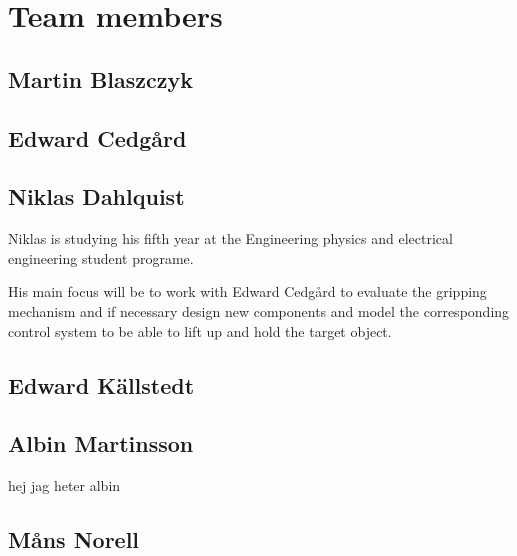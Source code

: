 \section{Team members}

\subsection{Martin Blaszczyk}

\subsection{Edward Cedgård}

\subsection{Niklas Dahlquist}
Niklas is studying his fifth year at the Engineering physics and electrical engineering student programe.

His main focus will be to work with Edward Cedgård to evaluate the gripping mechanism and if necessary design new components and model the corresponding control system to be able to lift up and hold the target object.

\subsection{Edward Källstedt}

\subsection{Albin Martinsson} hej jag heter albin

\subsection{Måns Norell}










